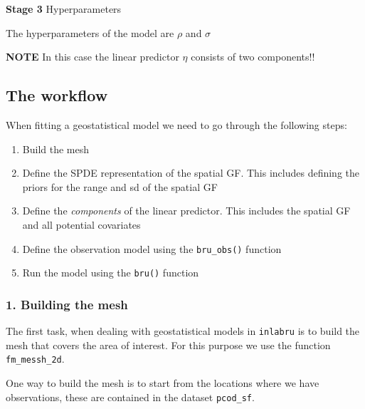 \documentclass[
  letterpaper,
  DIV=11,
  numbers=noendperiod]{scrartcl}
\begin{document}
\textbf{Stage 3} Hyperparameters

The hyperparameters of the model are \(\rho\) and \(\sigma\)

\textbf{NOTE} In this case the linear predictor \(\eta\) consists of two
components!!

\subsection{The workflow}\label{the-workflow}

When fitting a geostatistical model we need to go through the following
steps:

\begin{enumerate}
\def\labelenumi{\arabic{enumi}.}
\item
  Build the mesh
\item
  Define the SPDE representation of the spatial GF. This includes
  defining the priors for the range and sd of the spatial GF
\item
  Define the \emph{components} of the linear predictor. This includes
  the spatial GF and all potential covariates
\item
  Define the observation model using the \texttt{bru\_obs()} function
\item
  Run the model using the \texttt{bru()} function
\end{enumerate}

\subsubsection{1. Building the mesh}\label{building-the-mesh}

The first task, when dealing with geostatistical models in
\texttt{inlabru} is to build the mesh that covers the area of interest.
For this purpose we use the function \texttt{fm\_messh\_2d}.

One way to build the mesh is to start from the locations where we have
observations, these are contained in the dataset \texttt{pcod\_sf}.
\end{document}
